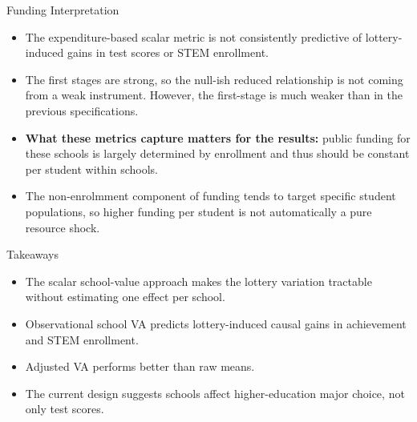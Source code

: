 \documentclass[notes,11pt,aspectratio=169]{beamer}
\newenvironment{wideitemize}{%
  \begin{minipage}{0.90\textwidth}
  \begin{itemize}
  \addtolength{\itemsep}{1em}
}{%
  \end{itemize}
  \end{minipage}
}
\begin{document}
\begin{frame}{Funding Interpretation}
\begin{wideitemize}
  \item The expenditure-based scalar metric is not consistently predictive of lottery-induced gains in test scores or STEM enrollment.

  \item The first stages are strong, so the null-ish reduced relationship is not coming from a weak instrument.
  However, the first-stage is much weaker than in the previous specifications.

  \item \textbf{What these metrics capture matters for the results:} public funding for these schools is largely determined by enrollment and thus should be constant per student within schools.
  \item The non-enrolmment component of funding tends to target specific student populations, so higher funding per student is not automatically a pure resource shock.

\end{wideitemize}
\end{frame}

\begin{frame}{Takeaways}
\small
\begin{wideitemize}
  \item The scalar school-value approach makes the lottery variation tractable without estimating one effect per school.

  \item Observational school VA predicts lottery-induced causal gains in achievement and STEM enrollment.

  \item Adjusted VA performs better than raw means.

  \item The current design suggests schools affect higher-education major choice, not only test scores.

\end{wideitemize}
\end{frame}
\end{document}
